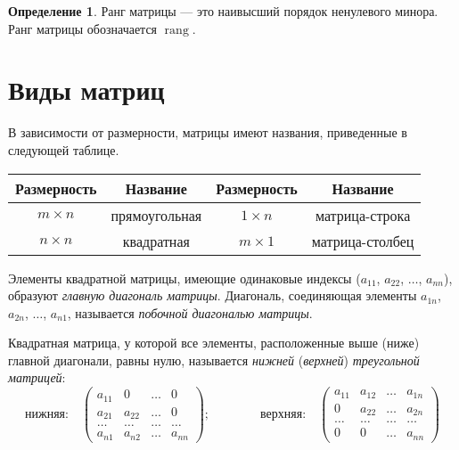 \documentclass[a5paper, 11pt]{extbook}
\theoremstyle{definition}
\theoremstyle{definition}
\newtheorem{definition}{Определение}[chapter]
\DeclareMathOperator{\rang}{rang}
\begin{document}
\begin{definition}
    Ранг матрицы — это наивысший порядок ненулевого минора. Ранг матрицы обозначается \(\rang\).
\end{definition}

\section{Виды матриц}
\label{sec:orgbc2a2b4}
В зависимости от размерности, матрицы имеют названия, приведенные в следующей таблице.
\begin{center}
    \begin{tabular}{|c|c|c|c|}
        Размерность    & Название      & Размерность    & Название        \\
        \hline
        \(m \times n\) & прямоугольная & \(1 \times n\) & матрица-строка  \\
        \(n \times n\) & квадратная    & \(m \times 1\) & матрица-столбец \\
    \end{tabular}
\end{center}

Элементы квадратной матрицы, имеющие одинаковые индексы (\(a_{11}\), \(a_{22}\), \(\ldots\), \(a_{nn}\)), образуют \emph{главную диагональ матрицы}. Диагональ, соединяющая элементы \(a_{1n}\), \(a_{2n}\), \(\ldots\), \(a_{n1}\), называется \emph{побочной диагональю матрицы}.

Квадратная матрица, у которой все элементы, расположенные выше (ниже) главной диагонали, равны нулю, называется \emph{нижней} (\emph{верхней}) \emph{треугольной матрицей}:
\begin{equation*}
    \text{нижняя:}
    \quad
    \begin{pmatrix}
        a_{11} & 0      & \ldots & 0      \\
        a_{21} & a_{22} & \ldots & 0      \\
        \ldots & \ldots & \ldots & \ldots \\
        a_{n1} & a_{n2} & \ldots & a_{nn}
    \end{pmatrix};
    \qquad \qquad
    \text{верхняя:}
    \quad
    \begin{pmatrix}
        a_{11} & a_{12} & \ldots & a_{1n} \\
        0      & a_{22} & \ldots & a_{2n} \\
        \ldots & \ldots & \ldots & \ldots \\
        0      & 0      & \ldots & a_{nn}
    \end{pmatrix}
\end{equation*}
\end{document}
